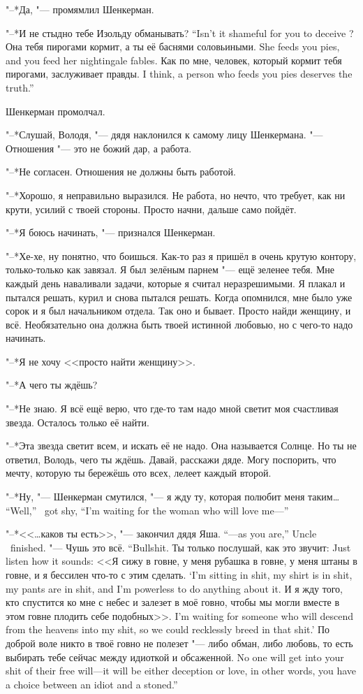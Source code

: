 "--*Да, "--- промямлил Шенкерман.

{"--*И не стыдно тебе Изольду обманывать?}
{``Isn't it shameful for you to deceive \Izolda?}
{Она тебя пирогами кормит, а ты её баснями соловьиными.}
{She feeds you pies, and you feed her nightingale fables.}
{Как по мне, человек, который кормит тебя пирогами, заслуживает правды.}
{I think, a person who feeds you pies deserves the truth.''}

Шенкерман промолчал.

"--*Слушай, Володя, "--- дядя наклонился к самому лицу Шенкермана.
"--- Отношения "--- это не божий дар, а работа.

"--*Не согласен.
Отношения не должны быть работой.

"--*Хорошо, я неправильно выразился.
Не работа, но нечто, что требует, как ни крути, усилий с твоей стороны.
Просто начни, дальше само пойдёт.

"--*Я боюсь начинать, "--- признался Шенкерман.

"--*Хе-хе, ну понятно, что боишься.
Как-то раз я пришёл в очень крутую контору, только-только как завязал.
Я был зелёным парнем "--- ещё зеленее тебя.
Мне каждый день наваливали задачи, которые я считал неразрешимыми.
Я плакал и пытался решать, курил и снова пытался решать.
Когда опомнился, мне было уже сорок и я был начальником отдела.
Так оно и бывает.
Просто найди женщину, и всё.
Необязательно она должна быть твоей истинной любовью, но с чего-то надо начинать.

"--*Я не хочу <<просто найти женщину>>.

"--*А чего ты ждёшь?

"--*Не знаю.
Я всё ещё верю, что где-то там надо мной светит моя счастливая звезда.
Осталось только её найти.

"--*Эта звезда светит всем, и искать её не надо.
Она называется Солнце.
Но ты не ответил, Володь, чего ты ждёшь.
Давай, расскажи дяде.
Могу поспорить, что мечту, которую ты бережёшь ото всех, лелеет каждый второй.

{"--*Ну, "--- Шенкерман смутился, "--- я жду ту, которая полюбит меня таким\ldots{}}
{``Well,'' \Shenkerman\ got shy, ``I'm waiting for the woman who will love me---''}

{"--*<<\ldots{}каков ты есть>>, "--- закончил дядя Яша.}
{``---as you are,'' Uncle \Yasha\ finished.}
{"--- Чушь это всё.}
{``Bullshit.}
{Ты только послушай, как это звучит:}
{Just listen how it sounds:}
{<<Я сижу в говне, у меня рубашка в говне, у меня штаны в говне, и я бессилен что-то с этим сделать.}
{`I'm sitting in shit, my shirt is in shit, my pants are in shit, and I'm powerless to do anything about it.}
{И я жду того, кто спустится ко мне с небес и залезет в моё говно, чтобы мы могли вместе в этом говне плодить себе подобных>>.}
{I'm waiting for someone who will descend from the heavens into my shit, so we could recklessly breed in that shit.'}
{По доброй воле никто в твоё говно не полезет "--- либо обман, либо любовь, то есть выбирать тебе сейчас между идиоткой и обсаженной.}
{No one will get into your shit of their free will---it will be either deception or love, in other words, you have a choice between an idiot and a stoned.''}

